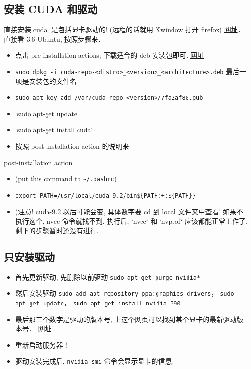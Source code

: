 
\subsection{安装 CUDA 和驱动}
直接安装 cuda, 是包括显卡驱动的! (远程的话就用 Xwindow 打开 firefox)
\href{https://docs.nvidia.com/cuda/cuda-installation-guide-linux/index.html#ubuntu-installation}{网址}． 直接看 3.6 Ubuntu, 按照步骤来．
\begin{itemize}
\item 点击 pre-installation actions, 下载适合的 deb 安装包即可. \href{https://developer.nvidia.com/cuda-downloads}{网址}
\item \verb`sudo dpkg -i cuda-repo-<distro>_<version>_<architecture>.deb`   最后一项是安装包的文件名
\item \verb`sudo apt-key add /var/cuda-repo-<version>/7fa2af80.pub`
\item `sudo apt-get update`
\item `sudo apt-get install cuda`
\item 按照 post-installation action 的说明来
\end{itemize}

post-installation action
\begin{itemize}
\item (put this command to \verb|~/.bashrc|)
\item \verb`export PATH=/usr/local/cuda-9.2/bin${PATH:+:${PATH}}`
\item (注意! cuda-9.2 以后可能会变, 具体数字要 cd 到 local 文件夹中查看!
如果不执行这个, nvcc 命令就找不到. 执行后, `nvcc` 和 `nvprof` 应该都能正常工作了.
剩下的步骤暂时还没有进行.
\end{itemize}

\subsection{只安装驱动}
\begin{itemize}
\item 首先更新驱动, 先删除以前驱动 \verb|sudo apt-get purge nvidia*|
\item 然后安装驱动 \verb|sudo add-apt-repository ppa:graphics-drivers|， \verb|sudo apt-get update|， \verb|sudo apt-get install nvidia-390|
\item 最后那三个数字是驱动的版本号, 上这个网页可以找到某个显卡的最新驱动版本号． \href{http://www.nvidia.com/Download/index.aspx?lang=en-us}{网址}
\item 重新启动服务器！
\item 驱动安装完成后, \verb|nvidia-smi| 命令会显示显卡的信息.
\end{itemize}
